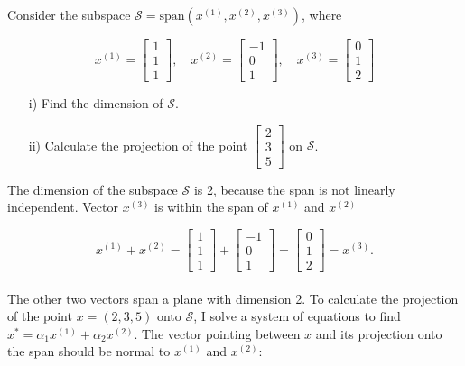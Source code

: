 \begin{homeworkProblem}

Consider the subspace $\mathcal S=\text{span} (x^{(1)},x^{(2)},x^{(3)})$, 
where

\begin{equation}
    x^{(1)}=\left[\begin{array}{c} 1\\ 1 \\ 1\end{array} \right], \quad 
    x^{(2)}=\left[\begin{array}{c} -1\\ 0 \\ 1\end{array} \right], \quad 
    x^{(3)}=\left[\begin{array}{c} 0\\ 1 \\ 2\end{array} \right]
\end{equation}

\begin{itemize}
    \item [i)] Find the dimension of $\mathcal S$.
    \item [ii)] Calculate the projection of the point 
    $\left[\begin{array}{c} 2\\ 3 \\ 5\end{array} \right]$ on $\mathcal S$.
\end{itemize}

\begin{solution}
    
    The dimension of the subspace $\mathcal{S}$ is 2, because the span is 
    not linearly independent. Vector $x^{(3)}$ is within the span of 
    $x^{(1)}$ and $x^{(2)}$

    \[
        x^{(1)} + x^{(2)} = 
        \left[\begin{array}{c} 1\\ 1 \\ 1\end{array} \right] +
        \left[\begin{array}{c} -1\\ 0 \\ 1\end{array} \right] =
        \left[\begin{array}{c} 0\\ 1 \\ 2\end{array} \right] = 
        x^{(3)}.
    \]
    \\
    The other two vectors span a plane with dimension 2. To calculate the
    projection of the point $x = (2, 3, 5)$ onto $\mathcal{S}$, I solve a 
    system of equations to find $x^* = \alpha_1 x^{(1)} + \alpha_2 x^{(2)}$. 
    The vector pointing between $x$ and its projection onto the span should 
    be normal to $x^{(1)}$ and $x^{(2)}$:


\end{solution}
\end{homeworkProblem}
